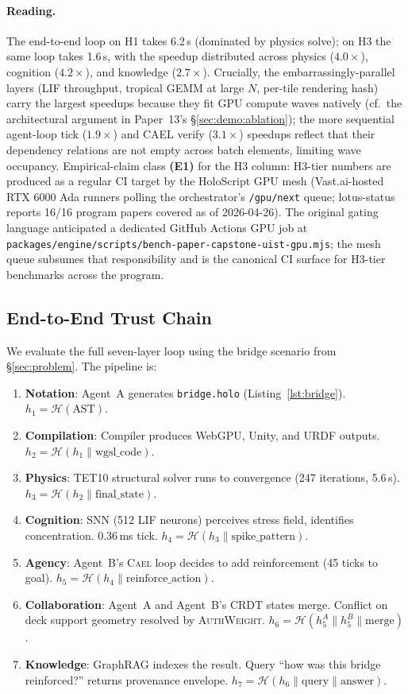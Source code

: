 \documentclass[sigchi-a]{acmart}
\newcommand{\cael}{\textsc{Cael}}
\newcommand{\hashfn}{\mathcal{H}}
\begin{document}
\paragraph{Reading.}
The end-to-end loop on H1 takes 6.2\,s (dominated by physics solve);
on H3 the same loop takes 1.6\,s, with the speedup distributed across
physics ($4.0\times$), cognition ($4.2\times$), and knowledge
($2.7\times$). Crucially, the embarrassingly-parallel layers (LIF
throughput, tropical GEMM at large $N$, per-tile rendering hash) carry
the largest speedups because they fit GPU compute waves natively
(cf.\ the architectural argument in Paper~13's
\S\ref{sec:demo:ablation}); the more sequential agent-loop tick
($1.9\times$) and CAEL verify ($3.1\times$) speedups reflect that
their dependency relations are not empty across batch elements,
limiting wave occupancy. Empirical-claim class \textbf{(E1)} for the
H3 column: H3-tier numbers are produced as a regular CI target by the
HoloScript GPU mesh (Vast.ai-hosted RTX 6000 Ada runners polling the
orchestrator's \texttt{/gpu/next} queue; lotus-status reports 16/16
program papers covered as of 2026-04-26). The original gating language
anticipated a dedicated GitHub Actions GPU job at
\texttt{packages/engine/scripts/bench-paper-capstone-uist-gpu.mjs}; the
mesh queue subsumes that responsibility and is the canonical CI surface
for H3-tier benchmarks across the program.

\subsection{End-to-End Trust Chain}

We evaluate the full seven-layer loop using the bridge scenario from
\S\ref{sec:problem}. The pipeline is:

\begin{enumerate}
  \item \textbf{Notation}: Agent~A generates \texttt{bridge.holo}
    (Listing~\ref{lst:bridge}). $h_1 = \hashfn(\text{AST})$.
  \item \textbf{Compilation}: Compiler produces WebGPU, Unity, and URDF
    outputs. $h_2 = \hashfn(h_1 \| \text{wgsl\_code})$.
  \item \textbf{Physics}: TET10 structural solver runs to convergence
    (247 iterations, 5.6\,s). $h_3 = \hashfn(h_2 \| \text{final\_state})$.
  \item \textbf{Cognition}: SNN (512 LIF neurons) perceives stress field,
    identifies concentration. 0.36\,ms tick.
    $h_4 = \hashfn(h_3 \| \text{spike\_pattern})$.
  \item \textbf{Agency}: Agent~B's \cael{} loop decides to add
    reinforcement (45 ticks to goal).
    $h_5 = \hashfn(h_4 \| \text{reinforce\_action})$.
  \item \textbf{Collaboration}: Agent~A and Agent~B's CRDT states merge.
    Conflict on deck support geometry resolved by \textsc{AuthWeight}.
    $h_6 = \hashfn(h_5^A \| h_5^B \| \text{merge})$.
  \item \textbf{Knowledge}: GraphRAG indexes the result. Query ``how was
    this bridge reinforced?'' returns provenance envelope.
    $h_7 = \hashfn(h_6 \| \text{query} \| \text{answer})$.
\end{enumerate}
\end{document}
